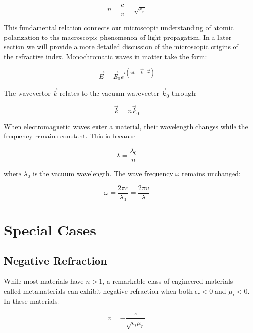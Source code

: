 \documentclass[
  a4paper,
]{book}
\begin{document}
\[
n=\frac{c}{v}=\sqrt{\epsilon_r}
\tag{refractive index}
\]

This fundamental relation connects our microscopic understanding of
atomic polarization to the macroscopic phenomenon of light propagation.
In a later section we will provide a more detailed discussion of the
microscopic origins of the refractive index. Monochromatic waves in
matter take the form:

\[
\vec{E}=\vec{E}_0e^{i(\omega t- \vec{k}\cdot \vec{r})}
\]

The wavevector \(\vec{k}\) relates to the vacuum wavevector
\(\vec{k}_0\) through:

\[
\vec{k}=n\vec{k}_0
\]

When electromagnetic waves enter a material, their wavelength changes
while the frequency remains constant. This is because:

\[
\lambda = \frac{\lambda_0}{n}
\]

where \(\lambda_0\) is the vacuum wavelength. The wave frequency
\(\omega\) remains unchanged:

\[
\omega = \frac{2\pi c}{\lambda_0} = \frac{2\pi v}{\lambda}
\]

\section{Special Cases}\label{special-cases}

\subsection{Negative Refraction}\label{negative-refraction}

While most materials have \(n>1\), a remarkable class of engineered
materials called metamaterials can exhibit negative refraction when both
\(\epsilon_r<0\) and \(\mu_r<0\). In these materials:

\[
v=-\frac{c}{\sqrt{\epsilon_r\mu_r}}
\tag{negative refraction}
\]
\end{document}
